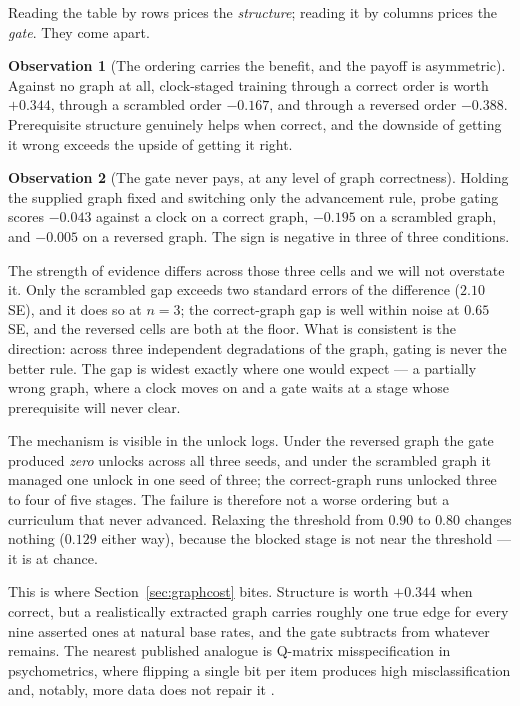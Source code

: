 \documentclass[11pt]{article}
\theoremstyle{plain}
\theoremstyle{definition}
\newtheorem{observation}{Observation}
\theoremstyle{remark}
\begin{document}
Reading the table by rows prices the \emph{structure}; reading it by columns
prices the \emph{gate}. They come apart.

\begin{observation}[The ordering carries the benefit, and the payoff is asymmetric]
\label{obs:asym}
Against no graph at all, clock-staged training through a correct order is worth
$+0.344$, through a scrambled order $-0.167$, and through a reversed order
$-0.388$. Prerequisite structure genuinely helps when correct, and the downside
of getting it wrong exceeds the upside of getting it right.
\end{observation}

\begin{observation}[The gate never pays, at any level of graph correctness]
\label{obs:wrong}
Holding the supplied graph fixed and switching only the advancement rule, probe
gating scores $-0.043$ against a clock on a correct graph, $-0.195$ on a
scrambled graph, and $-0.005$ on a reversed graph. The sign is negative in three
of three conditions.
\end{observation}

The strength of evidence differs across those three cells and we will not
overstate it. Only the scrambled gap exceeds two standard errors of the
difference ($2.10$ SE), and it does so at $n = 3$; the correct-graph gap is well
within noise at $0.65$ SE, and the reversed cells are both at the floor. What is
consistent is the direction: across three independent degradations of the graph,
gating is never the better rule. The gap is widest exactly where one would expect
--- a partially wrong graph, where a clock moves on and a gate waits at a stage
whose prerequisite will never clear.

The mechanism is visible in the unlock logs. Under the reversed graph the gate
produced \emph{zero} unlocks across all three seeds, and under the scrambled
graph it managed one unlock in one seed of three; the correct-graph runs unlocked
three to four of five stages. The failure is therefore not a worse ordering but a
curriculum that never advanced. Relaxing the threshold from $0.90$ to $0.80$
changes nothing ($0.129$ either way), because the blocked stage is not near the
threshold --- it is at chance.

This is where Section~\ref{sec:graphcost} bites. Structure is worth $+0.344$ when
correct, but a realistically extracted graph carries roughly one true edge for
every nine asserted ones at natural base rates, and the gate subtracts from
whatever remains. The nearest published analogue is Q-matrix misspecification in
psychometrics, where flipping a single bit per item produces high
misclassification and, notably, more data does not repair it
\citep{rupp2008qmatrix}.
\end{document}
